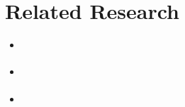 \section{Related Research}
\begin{itemize}
	\item \cite{huberman_evolutionary_1993}
	\item \cite{a_framework_2008}
	\item \cite{botta_time_2010}
\end{itemize} 

\cite{botta_time_2010}
